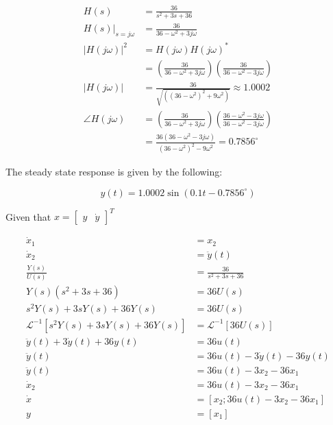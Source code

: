 \documentclass[12pt]{article}
\begin{document}
		$$
		\begin{aligned}
			H(s) & =\frac{36}{s^{2}+3 s+36} \\
			\left.H(s)\right|_{s=j \omega} & =\frac{36}{36-\omega^{2}+3 j \omega} \\
			|H(j \omega)|^{2} & =H(j \omega) H(j \omega)^{*} \\
			& =\left(\frac{36}{36-\omega^{2}+3 j \omega}\right)\left(\frac{36}{36-\omega^{2}-3 j \omega}\right) \\
			|H(j \omega)| & =\frac{36}{\sqrt{\left(\left(36-\omega^{2}\right)^{2}+9 \omega^{2}\right)}}  \approx 1.0002\\
			\angle H(j \omega) & =\left(\frac{36}{36-\omega^{2}+3 j \omega}\right)\left(\frac{36-\omega^{2}-3 j \omega}{36-\omega^{2}-3 j \omega}\right) \\
			& =\frac{36\left(36-\omega^{2}-3 j \omega\right)}{\left(36-\omega^{2}\right)^{2}-9 \omega^{2}} = 0.7856^{\circ}
		\end{aligned}
		$$
		
		The steady state response is given by the following:
		
		$$
		y(t)=1.0002 \sin \left(0.1 t-0.7856^{\circ}\right)
		$$
		
		Given that $x=\left[\begin{array}{ll}y & \dot{y}\end{array}\right]^{T}$
		
		$$
		\begin{aligned}
			\dot{x}_{1} & =x_{2} \\
			\dot{x}_{2} & =\ddot{y}(t) \\
			\frac{Y(s)}{U(s)} & =\frac{36}{s^{2}+3 s+36} \\
			Y(s)\left(s^{2}+3 s+36\right) & =36 U(s) \\
			s^{2} Y(s)+3 s Y(s)+36 Y(s) & =36 U(s) \\
			\mathcal{L}^{-1}\left[s^{2} Y(s)+3 s Y(s)+36 Y(s)\right] & =\mathcal{L}^{-1}[36 U(s)] \\
			\ddot{y}(t)+3 \dot{y}(t)+36 y(t) & =36 u(t) \\
			\ddot{y}(t) & =36 u(t)-3 \dot{y}(t)-36 y(t) \\
			\ddot{y}(t) & =36 u(t)-3 x_{2}-36 x_{1} \\
			\dot{x}_{2} & =36 u(t)-3 x_{2}-36 x_{1} \\
			\dot{x} & =\left[x_{2}; 36 u(t)-3 x_{2}-36 x_{1}\right] \\
			y & =\left[x_{1}\right]
		\end{aligned}
		$$
		
\end{document}
